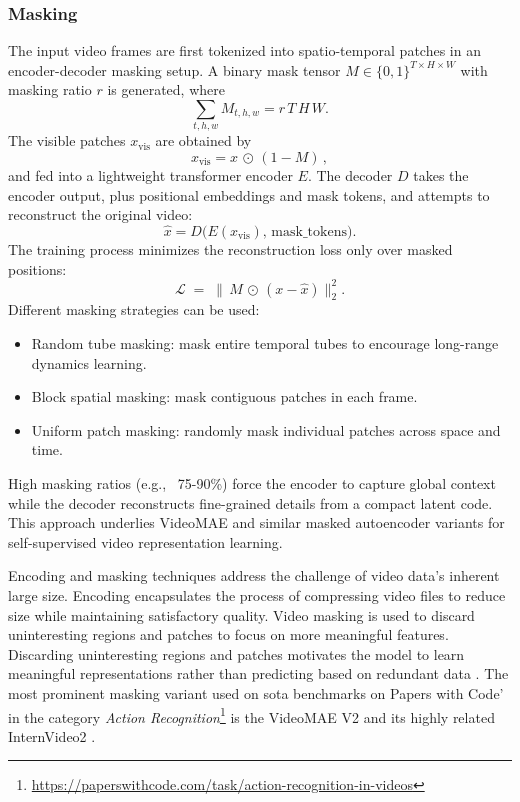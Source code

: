 \subsubsection{Masking}

The input video frames are first tokenized into spatio-temporal patches in an encoder-decoder masking setup. A binary mask tensor \(M\in\{0,1\}^{T\times H\times W}\) with masking ratio \(r\) is generated, where
\[
\sum_{t,h,w} M_{t,h,w} = r\,T\,H\,W.
\]
The visible patches \(x_\text{vis}\) are obtained by
\[
x_\text{vis} = x \,\odot\,(1 - M)\,,
\]
and fed into a lightweight transformer encoder \(E\). The decoder \(D\) takes the encoder output, plus positional embeddings and mask tokens, and attempts to reconstruct the original video:
\[
\hat{x} = D\bigl(E(x_\text{vis}),\,\text{mask\_tokens}\bigr).
\]
The training process minimizes the reconstruction loss only over masked positions:
\[
\mathcal{L} \;=\; \bigl\lVert\,M \,\odot\,(x - \hat{x})\bigr\rVert_2^2.
\]
Different masking strategies can be used:
\begin{itemize}
    \item Random tube masking: mask entire temporal tubes to encourage long-range dynamics learning.
    \item Block spatial masking: mask contiguous patches in each frame.
    \item Uniform patch masking: randomly mask individual patches across space and time.
\end{itemize}
High masking ratios (e.g., \ 75-90\%) force the encoder to capture global context while the decoder reconstructs fine-grained details from a compact latent code. This approach underlies VideoMAE and similar masked autoencoder variants for self-supervised video representation learning.


Encoding and masking techniques address the challenge of video data's inherent large size. Encoding encapsulates the process of compressing video files to reduce size while maintaining satisfactory quality. Video masking is used to discard uninteresting regions and patches to focus on more meaningful features. Discarding uninteresting regions and patches motivates the model to learn meaningful representations rather than predicting based on redundant data \cite{tong_videomae_2022}. The most prominent masking variant used on \acrshort{sota} benchmarks on Papers with Code' in the category \textit{Action Recognition}\footnote{\url{https://paperswithcode.com/task/action-recognition-in-videos}} is the VideoMAE V2 \cite{wang_videomae_2023} and its highly related InternVideo2 \cite{wang_internvideo2_2024}. 

